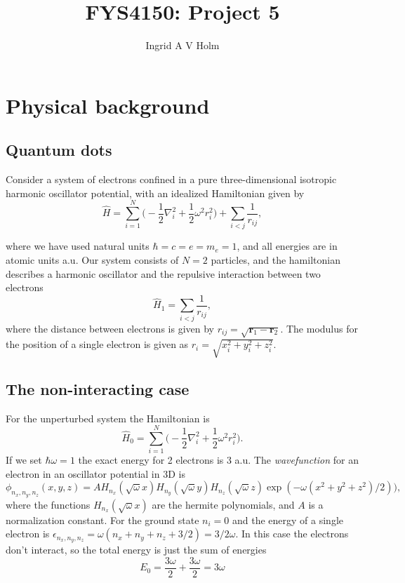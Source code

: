 \documentclass[11pt]{article}
\begin{document}
\title{FYS4150: Project 5}
\author{Ingrid A V Holm}
\maketitle

\section{Physical background}

\subsection{Quantum dots}

\begin{flushleft}
Consider a system of electrons confined in a pure three-dimensional isotropic harmonic oscillator potential, with an idealized Hamiltonian given by
\begin{equation}
\hat{H} = \sum_{i=1}^N \big(-\frac{1}{2} \nabla_i^2 + \frac{1}{2} \omega^2 r^2_i  \big) + \sum_{i<j} \frac{1}{r_{ij}},
\end{equation}

where we have used natural units $\hbar = c = e=m_e=1$, and all energies are in atomic units a.u. Our system consists of $N=2$ particles, and the hamiltonian describes a harmonic oscillator and the repulsive interaction between two electrons
\begin{equation}
\hat{H}_1=\sum_{i<j}\frac{1}{r_{ij}},
\end{equation}
where the distance between electrons is given by $r_{ij}= \sqrt{\textbf{r}_1-\textbf{r}_2}$. The modulus for the position of a single electron is given as $r_i = \sqrt{x_i^2+y_i^2+z_i^2}$.
\end{flushleft}

\subsection{The non-interacting case}
\begin{flushleft}
For the unperturbed system the Hamiltonian is
\begin{equation}
\hat{H}_0 = \sum_{i=1}^N \big( -\frac{1}{2} \nabla_i^2 + \frac{1}{2} \omega^2 r_i^2 \big).
\end{equation}
If we set $\hbar \omega=1$ the exact energy for 2 electrons is 3 a.u. The \textit{wavefunction} for an electron in an oscillator potential in 3D is
\begin{equation}
\phi_{n_x,n_y,n_z}(x,y,z) = AH_{n_x} (\sqrt{\omega}x)H_{n_y}(\sqrt{\omega}y)H_{n_z}(\sqrt{\omega}z) \exp(- \omega(x^2+y^2+z^2)/2)),
\end{equation}
where the functions $H_{n_x}(\sqrt{\omega}x)$ are the hermite polynomials, and $A$ is a normalization constant. For the ground state $n_i=0$ and the energy of a single electron is $\epsilon_{n_x, n_y, n_z}= \omega(n_x+n_y+n_z + 3/2)=3/2 \omega$. In this case the electrons don't interact, so the total energy is just the sum of energies
\begin{equation*}
E_0 = \frac{3\omega}{2} + \frac{3 \omega}{2} = 3 \omega
\end{equation*}
\end{flushleft}
\end{document}
